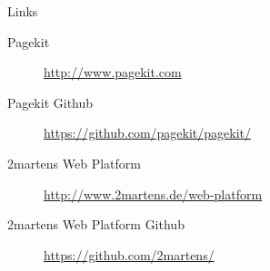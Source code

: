 \documentclass{beamer}
\begin{document}
	\begin{frame}{Links}
		\begin{description}
			\item[Pagekit] \url{http://www.pagekit.com}
			\item[Pagekit Github] \url{https://github.com/pagekit/pagekit/}
			\item[2martens Web Platform] \url{http://www.2martens.de/web-platform}
			\item[2martens Web Platform Github] \url{https://github.com/2martens/}			
		\end{description}
	\end{frame}
\end{document}
